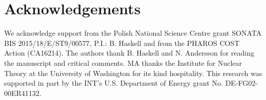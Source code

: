 \documentclass[usenatbib]{mnras}
\begin{document}

\section*{Acknowledgements}

We acknowledge support from the Polish National Science Centre grant SONATA BIS 2015/18/E/ST9/00577, P.I.: B. Haskell and from the PHAROS COST Action (CA16214). The authors thank B. Haskell and N. Andersson for reading the manuscript and critical comments. MA thanks the Institute for Nuclear Theory at the University of Washington for its kind hospitality. This research was supported in part by the INT's U.S. Department of Energy grant No. DE-FG02-00ER41132.



\appendix
\end{document}
